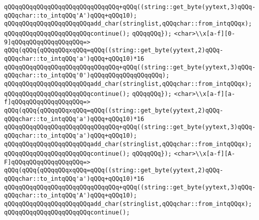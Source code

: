 \verb|qQQqqQQqqQQqqQQqqQQqqQQqqQQqqQQq+qQQq((string::get_byte(yytext,3)qQQq-qQQqchar::to_intqQQq'A')qQQq+qQQq10);|\newline
\verb|qQQqqQQqqQQqqQQqqQQqqQQqadd_char(stringlist,qQQqchar::from_intqQQqx);|\newline
\verb|qQQqqQQqqQQqqQQqqQQqqQQqcontinue();|\newline
\verb|qQQqqQQq});|\newline
\verb|<char>\\x[a-f][0-9]qQQqqQQqqQQqqQQqqQQq=>|\newline
\verb|qQQq(qQQq{qQQqqQQqxqQQq=qQQq((string::get_byte(yytext,2)qQQq-qQQqchar::to_intqQQq'a')qQQq+qQQq10)*16|\newline
\verb|qQQqqQQqqQQqqQQqqQQqqQQqqQQqqQQq+qQQq((string::get_byte(yytext,3)qQQq-qQQqchar::to_intqQQq'0')qQQqqQQqqQQqqQQqqQQq);|\newline
\verb|qQQqqQQqqQQqqQQqqQQqqQQqadd_char(stringlist,qQQqchar::from_intqQQqx);|\newline
\verb|qQQqqQQqqQQqqQQqqQQqqQQqcontinue();|\newline
\verb|qQQqqQQq});|\newline
\verb|<char>\\x[a-f][a-f]qQQqqQQqqQQqqQQqqQQq=>|\newline
\verb|qQQq(qQQq{qQQqqQQqxqQQq=qQQq((string::get_byte(yytext,2)qQQq-qQQqchar::to_intqQQq'a')qQQq+qQQq10)*16|\newline
\verb|qQQqqQQqqQQqqQQqqQQqqQQqqQQqqQQq+qQQq((string::get_byte(yytext,3)qQQq-qQQqchar::to_intqQQq'a')qQQq+qQQq10);|\newline
\verb|qQQqqQQqqQQqqQQqqQQqqQQqadd_char(stringlist,qQQqchar::from_intqQQqx);|\newline
\verb|qQQqqQQqqQQqqQQqqQQqqQQqcontinue();|\newline
\verb|qQQqqQQq});|\newline
\verb|<char>\\x[a-f][A-F]qQQqqQQqqQQqqQQqqQQq=>|\newline
\verb|qQQq(qQQq{qQQqqQQqxqQQq=qQQq((string::get_byte(yytext,2)qQQq-qQQqchar::to_intqQQq'a')qQQq+qQQq10)*16|\newline
\verb|qQQqqQQqqQQqqQQqqQQqqQQqqQQqqQQq+qQQq((string::get_byte(yytext,3)qQQq-qQQqchar::to_intqQQq'A')qQQq+qQQq10);|\newline
\verb|qQQqqQQqqQQqqQQqqQQqqQQqadd_char(stringlist,qQQqchar::from_intqQQqx);|\newline
\verb|qQQqqQQqqQQqqQQqqQQqqQQqcontinue();|\newline
